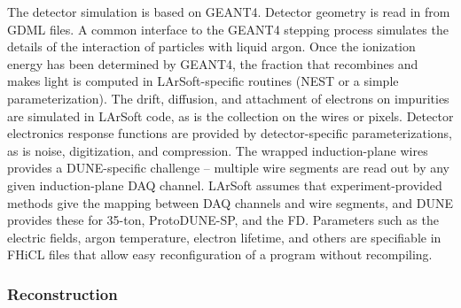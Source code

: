 The detector simulation is based on GEANT4.  Detector geometry is read in from GDML files.  A common interface to
the GEANT4 stepping process simulates the details of the interaction of particles with liquid argon.  Once
the ionization energy has been determined by GEANT4, the fraction that recombines and makes light is computed
in LArSoft-specific routines (NEST or a simple parameterization).  The drift, diffusion, and attachment of electrons
on impurities are simulated in LArSoft code, as is the collection on the wires or pixels.  Detector electronics
response functions are provided by detector-specific parameterizations, as is noise, digitization, and compression.
The wrapped induction-plane wires provides a DUNE-specific challenge -- multiple wire segments are read out by
any given induction-plane DAQ channel.  LArSoft assumes that experiment-provided methods give the mapping between
DAQ channels and wire segments, and DUNE provides these for 35-ton, ProtoDUNE-SP, and the FD.  Parameters
such as the electric fields, argon temperature, electron lifetime, and others are specifiable in FHiCL files
that allow easy reconfiguration of a program without recompiling.

\subsubsection{Reconstruction}

